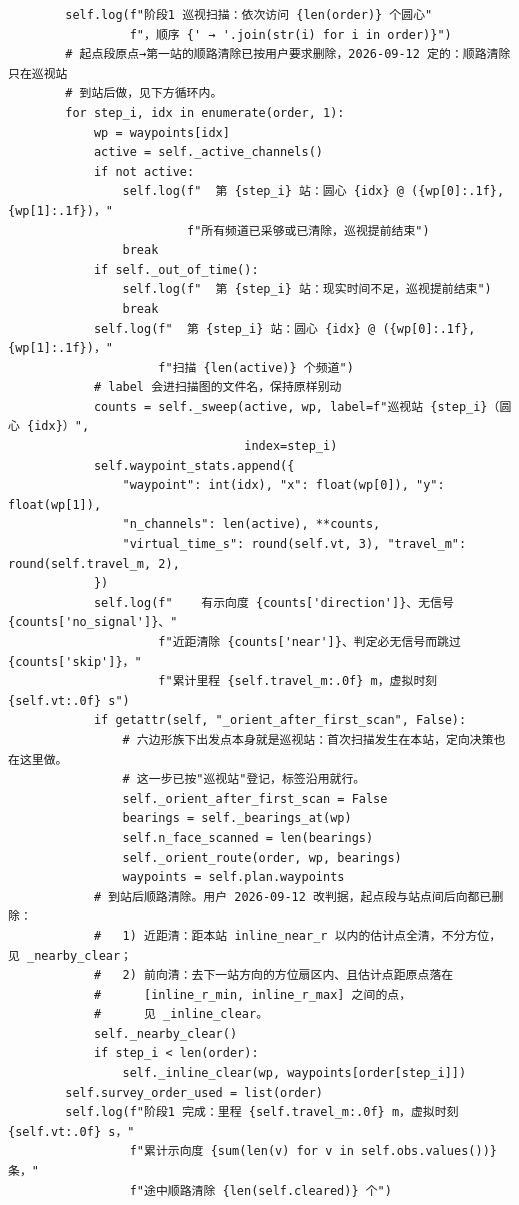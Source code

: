 \documentclass[UTF8, zihao=5,AutoFakeBold=2]{ctexart}
\begin{document}
\begin{lstlisting}
        self.log(f"阶段1 巡视扫描：依次访问 {len(order)} 个圆心"
                 f"，顺序 {' → '.join(str(i) for i in order)}")
        # 起点段原点→第一站的顺路清除已按用户要求删除，2026-09-12 定的：顺路清除只在巡视站
        # 到站后做，见下方循环内。
        for step_i, idx in enumerate(order, 1):
            wp = waypoints[idx]
            active = self._active_channels()
            if not active:
                self.log(f"  第 {step_i} 站：圆心 {idx} @ ({wp[0]:.1f}, {wp[1]:.1f})，"
                         f"所有频道已采够或已清除，巡视提前结束")
                break
            if self._out_of_time():
                self.log(f"  第 {step_i} 站：现实时间不足，巡视提前结束")
                break
            self.log(f"  第 {step_i} 站：圆心 {idx} @ ({wp[0]:.1f}, {wp[1]:.1f})，"
                     f"扫描 {len(active)} 个频道")
            # label 会进扫描图的文件名，保持原样别动
            counts = self._sweep(active, wp, label=f"巡视站 {step_i}（圆心 {idx}）",
                                 index=step_i)
            self.waypoint_stats.append({
                "waypoint": int(idx), "x": float(wp[0]), "y": float(wp[1]),
                "n_channels": len(active), **counts,
                "virtual_time_s": round(self.vt, 3), "travel_m": round(self.travel_m, 2),
            })
            self.log(f"    有示向度 {counts['direction']}、无信号 {counts['no_signal']}、"
                     f"近距清除 {counts['near']}、判定必无信号而跳过 {counts['skip']}，"
                     f"累计里程 {self.travel_m:.0f} m，虚拟时刻 {self.vt:.0f} s")
            if getattr(self, "_orient_after_first_scan", False):
                # 六边形族下出发点本身就是巡视站：首次扫描发生在本站，定向决策也在这里做。
                # 这一步已按"巡视站"登记，标签沿用就行。
                self._orient_after_first_scan = False
                bearings = self._bearings_at(wp)
                self.n_face_scanned = len(bearings)
                self._orient_route(order, wp, bearings)
                waypoints = self.plan.waypoints
            # 到站后顺路清除。用户 2026-09-12 改判据，起点段与站点间后向都已删除：
            #   1) 近距清：距本站 inline_near_r 以内的估计点全清，不分方位，见 _nearby_clear；
            #   2) 前向清：去下一站方向的方位扇区内、且估计点距原点落在
            #      [inline_r_min, inline_r_max] 之间的点，
            #      见 _inline_clear。
            self._nearby_clear()
            if step_i < len(order):
                self._inline_clear(wp, waypoints[order[step_i]])
        self.survey_order_used = list(order)
        self.log(f"阶段1 完成：里程 {self.travel_m:.0f} m，虚拟时刻 {self.vt:.0f} s，"
                 f"累计示向度 {sum(len(v) for v in self.obs.values())} 条，"
                 f"途中顺路清除 {len(self.cleared)} 个")


\end{lstlisting}
\end{document}
